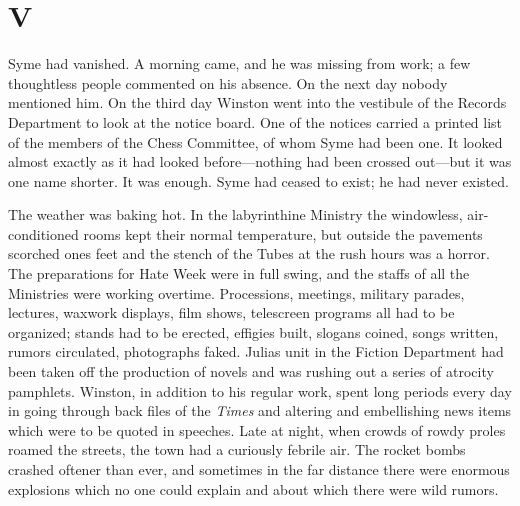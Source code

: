 \section{V}\label{v-1}

Syme had vanished. A morning came, and he was missing from work; a few
thoughtless people commented on his absence. On the next day nobody
mentioned him. On the third day Winston went into the vestibule of the
Records Department to look at the notice board. One of the notices
carried a printed list of the members of the Chess Committee, of whom
Syme had been one. It looked almost exactly as it had looked
before---nothing had been crossed out---but it was one name shorter. It
was enough. Syme had ceased to exist; he had never existed.

The weather was baking hot. In the labyrinthine Ministry the windowless,
air-conditioned rooms kept their normal temperature, but outside the
pavements scorched one\textquotesingle s feet and the stench of the
Tubes at the rush hours was a horror. The preparations for Hate Week
were in full swing, and the staffs of all the Ministries were working
overtime. Processions, meetings, military parades, lectures, waxwork
displays, film shows, telescreen programs all had to be organized;
stands had to be erected, effigies built, slogans coined, songs written,
rumors circulated, photographs faked. Julia\textquotesingle s unit in
the Fiction Department had been taken off the production of novels and
was rushing out a series of atrocity pamphlets. Winston, in addition to
his regular work, spent long periods every day in going through back
files of the \emph{Times} and altering and embellishing news items which
were to be quoted in speeches. Late at night, when crowds of rowdy
proles roamed the streets, the town had a curiously febrile air. The
rocket bombs crashed oftener than ever, and sometimes in the far
distance there were enormous explosions which no one could explain and
about which there were wild rumors.

